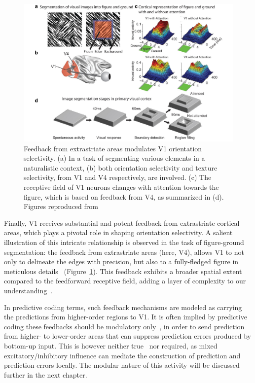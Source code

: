 \begin{figure}[htbp]
\vspace{0.1cm}
\centering
\includegraphics[width=1.\textwidth]{fig/chap4_roelfsema.pdf}
\caption[Feedback modulation of \gls{V1} activity.]{Feedback from extrastriate areas modulates \gls{V1} orientation selectivity. (a) In a task of segmenting various elements in a naturalistic context, (b) both orientation selectivity and texture selectivity, from \gls{V1} and V4 respectively, are involved. (c) The receptive field of \gls{V1} neurons changes with attention towards the figure, which is based on feedback from V4, as summarized in (d). Figures reproduced from~\cite{poort2012role}}
\label{fig_chap4_roelfsema}
\end{figure} 

Finally, \gls{V1} receives substantial and potent feedback from extrastriate cortical areas, which plays a pivotal role in shaping orientation selectivity. A salient illustration of this intricate relationship is observed in the task of figure-ground segmentation: the feedback from extrastriate areas (here, V4), allows \gls{V1} to not only to delineate the edges with precision, but also to a fully-fledged figure in meticulous details~\cite{poort2012role} (Figure~\ref{fig_chap4_roelfsema}). This feedback exhibits a broader spatial extent compared to the feedforward receptive field, adding a layer of complexity to our understanding~\cite{angelucci2006contribution}.

In predictive coding terms, such feedback mechanisms are modeled as carrying the predictions from higher-order regions to \gls{V1}. It is often implied by predictive coding these feedbacks should be modulatory only~\cite{bastos2012canonical}, in order to send prediction from higher- to lower-order areas that can suppress prediction errors produced by bottom-up input. This is however neither true~\cite{murphy1987corticofugal,wozny2011specificity, covic2011synaptic} nor required, as mixed excitatory/inhibitory influence can mediate the construction of prediction and prediction errors locally. The modular nature of this activity will be discussed further in the next chapter.

